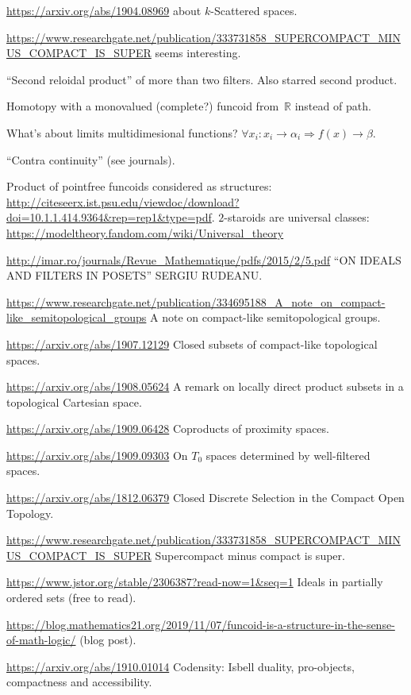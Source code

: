 \documentclass{amsart}
\begin{document}
\url{https://arxiv.org/abs/1904.08969} about $k$-Scattered spaces.

\url{https://www.researchgate.net/publication/333731858_SUPERCOMPACT_MINUS_COMPACT_IS_SUPER}
seems interesting.

``Second reloidal product'' of more than two filters.
Also starred second product.

Homotopy with a monovalued (complete?) funcoid from~$\mathbb{R}$
instead of path.

What's about limits multidimesional functions? $\forall x_i : x_i \rightarrow
\alpha_i \Rightarrow f (x) \rightarrow \beta$.

``Contra continuity'' (see journals).

Product of pointfree funcoids considered as structures:
\url{http://citeseerx.ist.psu.edu/viewdoc/download?doi=10.1.1.414.9364&rep=rep1&type=pdf}.
$2$-staroids are universal classes: \url{https://modeltheory.fandom.com/wiki/Universal_theory}

\url{http://imar.ro/journals/Revue_Mathematique/pdfs/2015/2/5.pdf}
``ON IDEALS AND FILTERS IN POSETS'' SERGIU RUDEANU.

\url{https://www.researchgate.net/publication/334695188_A_note_on_compact-like_semitopological_groups}
A note on compact-like semitopological groups.

\url{https://arxiv.org/abs/1907.12129} Closed subsets of compact-like topological spaces.

\url{https://arxiv.org/abs/1908.05624} A remark on locally direct product subsets in a topological Cartesian space.

\url{https://arxiv.org/abs/1909.06428} Coproducts of proximity spaces.

\url{https://arxiv.org/abs/1909.09303} On $T_0$ spaces determined by well-filtered spaces.

\url{https://arxiv.org/abs/1812.06379} Closed Discrete Selection in the Compact Open Topology.

\url{https://www.researchgate.net/publication/333731858_SUPERCOMPACT_MINUS_COMPACT_IS_SUPER}
Supercompact minus compact is super.

\url{https://www.jstor.org/stable/2306387?read-now=1&seq=1} Ideals in partially ordered sets (free to read).

\url{https://blog.mathematics21.org/2019/11/07/funcoid-is-a-structure-in-the-sense-of-math-logic/} (blog post).

\url{https://arxiv.org/abs/1910.01014} Codensity: Isbell duality, pro-objects, compactness and accessibility.
\end{document}
